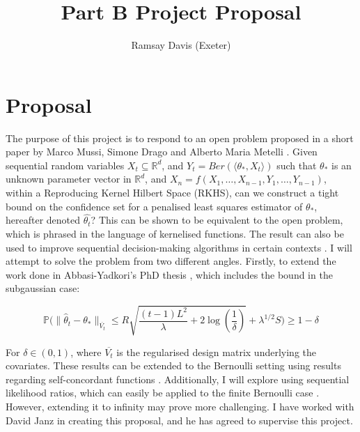 \documentclass[a4paper,12pt]{article}
\title{Part B Project Proposal }
\author{Ramsay Davis (Exeter)}
\date{}
\begin{document}
\maketitle

\section*{Proposal}
The purpose of this project is to respond to an open problem proposed in a short paper by Marco Mussi, Simone Drago and Alberto Maria Metelli \cite{open}. Given sequential random variables $X_t \subseteq \mathbb{R}^d$, and $Y_t =Ber( \langle \theta_*, X_t \rangle)$ such that $\theta_*$ is an unknown parameter vector in $\mathbb{R}^d$, 
and $X_n=f(X_1,\dots,X_{n-1},Y_1,\dots,Y_{n-1})$, within a Reproducing Kernel Hilbert Space (RKHS), can we construct a tight bound on the confidence set for a penalised least squares estimator of $\theta_*$, hereafter denoted $\hat{\theta_t}$? 
This can be shown to be equivalent to the open problem, which is phrased in the language of kernelised functions. The result can also be used to improve sequential decision-making algorithms in certain contexts \cite{banditbook}. 
I will attempt to solve the problem from two different angles. Firstly, to extend the work done in Abbasi-Yadkori's PhD thesis \cite{phd}, which includes the bound in the subgaussian case:

\begin{equation}
    \mathbb{P}\Big(\|\hat{\theta}_t - \theta_*\|_{\overline{V_t}} \leq R \sqrt{\frac{(t - 1)L^2}{\lambda} + 2 \log \left( \frac{1}{\delta} \right) } + \lambda^{1/2} S\Big) \geq 1 - \delta
\end{equation}

\noindent For $\delta \in (0,1)$, where $\overline{V_t}$ is the regularised design matrix underlying the covariates. These results can be extended to the Bernoulli setting using results regarding self-concordant functions \cite{conc}. 
Additionally, I will explore using sequential likelihood ratios, which can easily be applied to the finite Bernoulli case \cite{banditbook}. However, extending it to infinity may prove more challenging. 
I have worked with David Janz in creating this proposal, and he has agreed to supervise this project.




\end{document}
